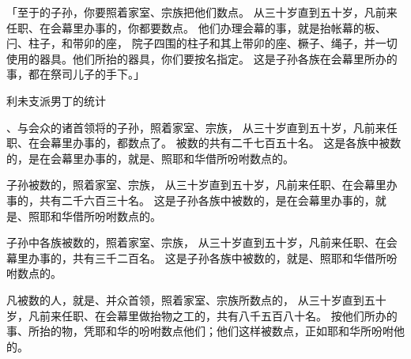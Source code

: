 {\par }{\PP {}「至于{}的子孙，你要照着家室、宗族把他们数点。
从三十岁直到五十岁，凡前来任职、在会幕里办事的，你都要数点。
他们办理会幕的事，就是抬帐幕的板、闩、柱子，和带卯的座，
院子四围的柱子和其上带卯的座、橛子、绳子，并一切使用的器具。他们所抬的器具，你们要按名指定。
这是{}子孙各族在会幕里所办的事，都在祭司{}儿子{}的手下。」
\par }{\SH 利未支派男丁的统计
\par }{\PP {}、{}与会众的诸首领将{}的子孙，照着家室、宗族，
从三十岁直到五十岁，凡前来任职、在会幕里办事的，都数点了。
被数的共有二千七百五十名。
这是{}各族中被数的，是在会幕里办事的，就是{}、{}照耶和华借{}所吩咐数点的。
\par }{\PP {}子孙被数的，照着家室、宗族，
从三十岁直到五十岁，凡前来任职、在会幕里办事的，共有二千六百三十名。
这是{}子孙各族中被数的，是在会幕里办事的，就是{}、{}照耶和华借{}所吩咐数点的。
\par }{\PP {}子孙中各族被数的，照着家室、宗族，
从三十岁直到五十岁，凡前来任职、在会幕里办事的，共有三千二百名。
这是{}子孙各族中被数的，就是{}、{}照耶和华借{}所吩咐数点的。
\par }{\PP {}凡被数的{}人，就是{}、{}并{}众首领，照着家室、宗族所数点的，
从三十岁直到五十岁，凡前来任职、在会幕里做抬物之工的，共有八千五百八十名。
按他们所办的事、所抬的物，凭耶和华的吩咐数点他们；他们这样被{}数点，正如耶和华所吩咐他的。

}
